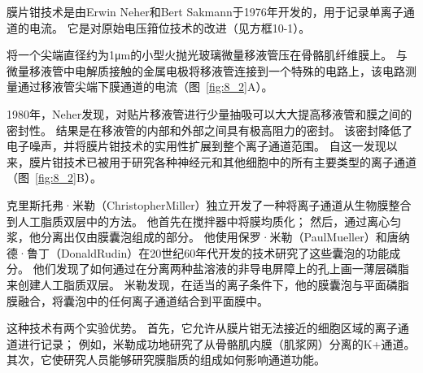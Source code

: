 \begin{proposition} \label{box:8_1}
	
	\quad \quad 膜片钳技术是由Erwin Neher和Bert Sakmann于1976年开发的，用于记录单离子通道的电流。
	它是对原始电压箝位技术的改进（见方框10-1）。
	
	\quad \quad 将一个尖端直径约为1μm的小型火抛光玻璃微量移液管压在骨骼肌纤维膜上。
	与微量移液管中电解质接触的金属电极将移液管连接到一个特殊的电路上，该电路测量通过移液管尖端下膜通道的电流（图~\ref{fig:8_2}A）。
	
	\quad \quad 1980年，Neher发现，对贴片移液管进行少量抽吸可以大大提高移液管和膜之间的密封性。
	结果是在移液管的内部和外部之间具有极高阻力的密封。
	该密封降低了电子噪声，并将膜片钳技术的实用性扩展到整个离子通道范围。
	自这一发现以来，膜片钳技术已被用于研究各种神经元和其他细胞中的所有主要类型的离子通道（图~\ref{fig:8_2}B）。
	
	\quad \quad 克里斯托弗·米勒（ChristopherMiller）独立开发了一种将离子通道从生物膜整合到人工脂质双层中的方法。
	他首先在搅拌器中将膜均质化；
	然后，通过离心匀浆，他分离出仅由膜囊泡组成的部分。
	他使用保罗·米勒（PaulMueller）和唐纳德·鲁丁（DonaldRudin）在20世纪60年代开发的技术研究了这些囊泡的功能成分。
	他们发现了如何通过在分离两种盐溶液的非导电屏障上的孔上画一薄层磷脂来创建人工脂质双层。
	米勒发现，在适当的离子条件下，他的膜囊泡与平面磷脂膜融合，将囊泡中的任何离子通道结合到平面膜中。
	
	\quad \quad 这种技术有两个实验优势。
	首先，它允许从膜片钳无法接近的细胞区域的离子通道进行记录；
	例如，米勒成功地研究了从骨骼肌内膜（肌浆网）分离的K+通道。
	其次，它使研究人员能够研究膜脂质的组成如何影响通道功能。
	
\end{proposition}


